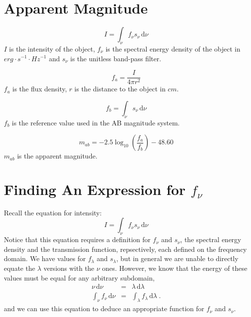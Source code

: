 \documentclass[12pt]{scrartcl}
\newcommand{\dx}[1]{\ensuremath{\,\mathrm{d}#1}}
\begin{document}
\maketitle

\section{Apparent Magnitude}

\[ I = \int_\nu f_\nu s_\nu \dx{\nu} \]
$I$ is the intensity of the object, $f_\nu$ is the spectral energy density of
the object in $erg\cdot s^{-1}\cdot Hz^{-1}$ and $s_\nu$ is the unitless band-pass filter.

\[ f_a = \frac{I}{4\pi r^2} \]
$f_a$ is the flux density, $r$ is the distance to the object in $cm$.

\[ f_b = \int_\nu s_\nu \dx{\nu} \]
$f_b$ is the reference value used in the AB magnitude system.

\[ m_{ab} = -2.5\log_{10}\left(\frac{f_a}{f_b}\right) - 48.60 \]
$m_{ab}$ is the apparent magnitude.

\section{Finding An Expression for $f_\nu$}

Recall the equation for intensity:
\[ I = \int_\nu f_\nu s_\nu \dx{\nu} \]
Notice that this equation requires a definition for $f_\nu$ and $s_\nu$,
the spectral energy density and the transmission function, repsectively, each
defined on the frequency domain. We have values for $f_\lambda$ and $s_\lambda$,
but in general we are unable to directly equate the $\lambda$ versions with
the $\nu$ ones. However, we know that the energy of these values
must be equal for any arbitrary subdomain,
\begin{eqnarray*}
\nu \dx{\nu} & = & \lambda \dx{\lambda} \\
\int_\nu f_\nu \dx{\nu} & = & \int_\lambda f_\lambda \dx{\lambda} \; .
\end{eqnarray*}
and we can use this equation to deduce an appropriate function for
$f_\nu$ and $s_\nu$.
\end{document}
